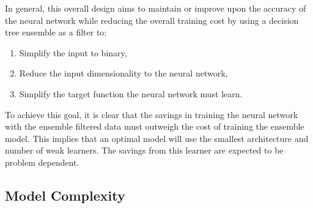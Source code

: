 \documentclass[paper=a4, fontsize=11pt]{scrartcl} %
\begin{document}
In general, this overall design aims to maintain or improve upon the accuracy of the neural network while reducing the overall training cost by using a decision tree ensemble as a filter to:
\begin{enumerate}
	\item Simplify the input to binary,
	\item Reduce the input dimensionality to the neural network,
	\item Simplify the target function the neural network must learn.
\end{enumerate}
To achieve this goal, it is clear that the savings in training the neural network with the ensemble filtered data must outweigh the cost of training the ensemble model.
This implies that an optimal model will use the smallest architecture and number of weak learners.
The savings from this learner are expected to be problem dependent.


\subsection*{Model Complexity}
\end{document}
